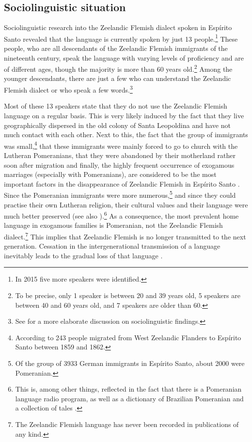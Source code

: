 \documentclass[output=paper,hidelinks,draftmode]{langscibook}
\begin{document}
\subsection{Sociolinguistic situation}
\label{sec:schaffel:1.2}
Sociolinguistic research into the Zeelandic Flemish dialect spoken in Espírito Santo \citep{Schaffel2010} revealed that the language is currently spoken by just 13 people.\footnote{In 2015 five more speakers were identified.} These people, who are all descendants of the Zeelandic Flemish immigrants of the nineteenth century, speak the language with varying levels of proficiency and are of different ages, though the majority is more than 60 years old.\footnote{ To be precise, only 1 speaker is between 20 and 39 years old, 5 speakers are between 40 and 60 years old, and 7 speakers are older than 60.} Among the younger descendants, there are just a few who can understand the Zeelandic Flemish dialect or who speak a few words.\footnote{See \citet{SchaffelBremenkampPostma2017} for a more elaborate discussion on  sociolinguistic findings.}

Most of these 13 speakers state that they do not use the Zeelandic Flemish language on a regular basis. This is very likely induced by the fact that they live geographically dispersed in the old colony of Santa Leopoldina and have not much contact with each other. Next to this, the fact that the group of immigrants was small,\footnote{According to \citet[50, 121]{RoosEshuis2008} 243 people migrated from West Zeelandic Flanders to Espírito Santo between 1859 and 1862.} that these immigrants were mainly forced to go to church with the Lutheran Pomeranians, that they were abandoned by their motherland rather soon after migration and finally, the highly frequent occurrence of exogamous marriages (especially with Pomeranians), are considered to be the most important factors in the disappearance of Zeelandic Flemish in Espírito Santo \citep[83--85]{Schaffel2010}. Since the Pomeranian immigrants were more numerous,\footnote{ {Of the group of 3933 German immigrants in Espírito Santo, about 2000 were Pomeranian.}} and since they could practise their own Lutheran religion, their cultural values and their language were much better preserved (see also \citealt{Postma2014, Postma2019}).\footnote{This is, among other things, reflected in the fact that there is a Pomeranian language radio program, as well as a dictionary of Brazilian Pomeranian \citep{Tressmann2006b} and a collection of tales \citep{Tressmann2006a}.} As a consequence, the most prevalent home language in exogamous families is Pomeranian, not the Zeelandic Flemish dialect.\footnote{The Zeelandic Flemish language has never been recorded in publications of any kind.} This implies that Zeelandic Flemish is no longer transmitted to the next generation. Cessation in the intergenerational transmission of a language inevitably leads to the gradual loss of that language \citep{Sasse1992}.
\end{document}
